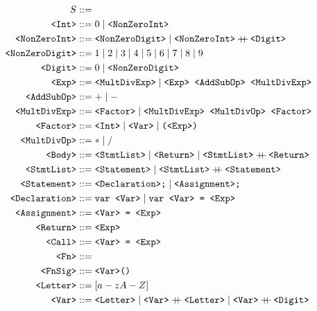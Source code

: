 \documentclass[12pt, letterpaper]{article}
\begin{document}
\begin{align*}
  S &::= \\
  \texttt{<Int>} &::= 0 \mid \texttt{<NonZeroInt>} \\
  \texttt{<NonZeroInt>} &::= \texttt{<NonZeroDigit>} \mid \texttt{<NonZeroInt>} \concat \texttt{<Digit>} \\
  \texttt{<NonZeroDigit>} &::= 1 \mid 2 \mid 3 \mid 4 \mid 5 \mid 6 \mid 7 \mid 8 \mid 9 \\
  \texttt{<Digit>} &::= 0 \mid \texttt{<NonZeroDigit>} \\
  \texttt{<Exp>} &::= \texttt{<MultDivExp>} \mid \texttt{<Exp> <AddSubOp> <MultDivExp>}  \\
  \texttt{<AddSubOp>} &::= + \mid - \\
  \texttt{<MultDivExp>} &::= \texttt{<Factor>} \mid \texttt{<MultDivExp> <MultDivOp> <Factor>} \\
  \texttt{<Factor>} &::= \texttt{<Int>} \mid \texttt{<Var>} \mid \texttt{(<Exp>)} \\
  \texttt{<MultDivOp>} &::= * \mid / \\
  \texttt{<Body>} &::= \texttt{<StmtList>} \mid \texttt{<Return>} \mid \texttt{<StmtList>} \concat \texttt{<Return>} \\
  \texttt{<StmtList>} &::= \texttt{<Statement>} \mid \texttt{<StmtList>} \concat \texttt{<Statement>} \\
  \texttt{<Statement>} &::= \texttt{<Declaration>;} \mid \texttt{<Assignment>;} \\
  \texttt{<Declaration>} &::= \texttt{var <Var>} \mid \texttt{var <Var> = <Exp>} \\
  \texttt{<Assignment>} &::= \texttt{<Var> = <Exp>} \\
  \texttt{<Return>} &::= \texttt{<Exp>} \\
  \texttt{<Call>} &::= \texttt{<Var> = <Exp>} \\
  \texttt{<Fn>} &::= \\
  \texttt{<FnSig>} &::= \texttt{<Var>()} \\
  \texttt{<Letter>} &::= [a-zA-Z] \\
  \texttt{<Var>} &::= \texttt{<Letter>} \mid \texttt{<Var>} \concat \texttt{<Letter>} \mid \texttt{<Var>} \concat \texttt{<Digit>} \\
\end{align*}
\end{document}
